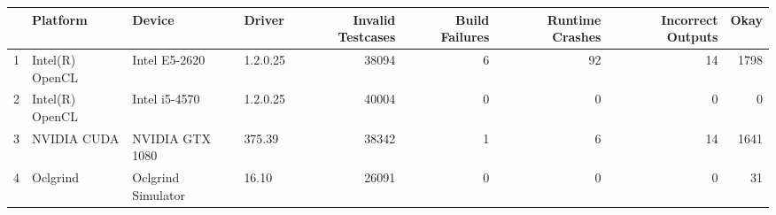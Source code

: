 \begin{tabular}{llllrrrrr}
\toprule
{} &         Platform &              Device &    Driver &  Invalid Testcases &  Build Failures &  Runtime Crashes &  Incorrect Outputs &  Okay \\
\midrule
1 &  Intel(R) OpenCL &       Intel E5-2620 &  1.2.0.25 &              38094 &               6 &               92 &                 14 &  1798 \\
2 &  Intel(R) OpenCL &       Intel i5-4570 &  1.2.0.25 &              40004 &               0 &                0 &                  0 &     0 \\
3 &      NVIDIA CUDA &     NVIDIA GTX 1080 &    375.39 &              38342 &               1 &                6 &                 14 &  1641 \\
4 &         Oclgrind &  Oclgrind Simulator &     16.10 &              26091 &               0 &                0 &                  0 &    31 \\
\bottomrule
\end{tabular}
